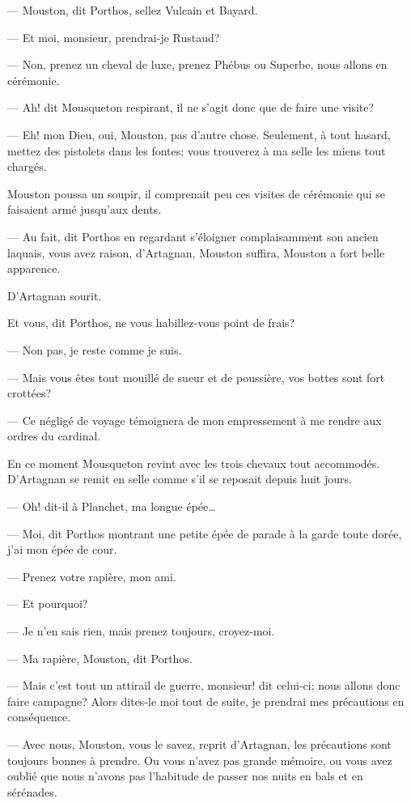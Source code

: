 — Mouston, dit Porthos, sellez Vulcain et Bayard.

— Et moi, monsieur, prendrai-je Rustaud?

— Non, prenez un cheval de luxe, prenez Phébus ou Superbe, nous allons en cérémonie.

— Ah! dit Mousqueton respirant, il ne s'agit donc que de faire une visite?

— Eh! mon Dieu, oui, Mouston, pas d'autre chose. Seulement, à tout hasard, mettez des pistolets dans les fontes; vous trouverez à ma selle les miens tout chargés.

Mouston poussa un soupir, il comprenait peu ces visites de cérémonie qui se faisaient armé jusqu'aux dents.

— Au fait, dit Porthos en regardant s'éloigner complaisamment son ancien laquais, vous avez raison, d'Artagnan, Mouston suffira, Mouston a fort belle apparence.

D'Artagnan sourit.

Et vous, dit Porthos, ne vous habillez-vous point de frais?

— Non pas, je reste comme je suis.

— Mais vous êtes tout mouillé de sueur et de poussière, vos bottes sont fort crottées?

— Ce négligé de voyage témoignera de mon empressement à me rendre aux ordres du cardinal.

En ce moment Mousqueton revint avec les trois chevaux tout accommodés. D'Artagnan se remit en selle comme s'il se reposait depuis huit jours.

— Oh! dit-il à Planchet, ma longue épée\dots

— Moi, dit Porthos montrant une petite épée de parade à la garde toute dorée, j'ai mon épée de cour.

— Prenez votre rapière, mon ami.

— Et pourquoi?

— Je n'en sais rien, mais prenez toujours, croyez-moi.

— Ma rapière, Mouston, dit Porthos.

— Mais c'est tout un attirail de guerre, monsieur! dit celui-ci; nous allons donc faire campagne? Alors dites-le moi tout de suite, je prendrai mes précautions en conséquence.

— Avec nous, Mouston, vous le savez, reprit d'Artagnan, les précautions sont toujours bonnes à prendre. Ou vous n'avez pas grande mémoire, ou vous avez oublié que nous n'avons pas l'habitude de passer nos nuits en bals et en sérénades.

